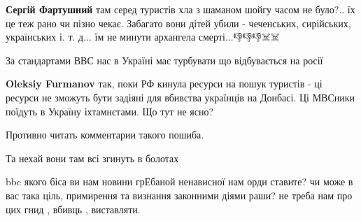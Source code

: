 \begin{itemize}
\begin{itemize}
\textbf{Сергій Фартушний} там серед туристів хла з шаманом шойгу часом не
було?.. їх це теж рано чи пізно чекає. Забагато вони дітей
убили - чеченських, сирійських, українських і. т. д... їм не минути архангела
смерті...👎👎👎☠️☠️
\end{itemize}

 
За стандартами ВВС нас в Україні має турбувати що відбувається на росії

\begin{itemize}
 
\textbf{Oleksiy Furmanov} так, поки РФ кинула ресурси на пошук туристів - ці ресурси не зможуть бути задіяні для вбивства українців на Донбасі.
Ці МВСники поїдуть в Україну іхтамнєтами.
Що тут не ясно?
\end{itemize}

 
Противно читать комментарии такого пошиба.

 
Та нехай вони там всі згинуть в болотах

 

bbc якого біса ви нам новини грЕбаной ненависної нам орди ставите? чи може в
вас така ціль, примирення та визнання законними діями раши? не треба нам про
цих гнид , вбивць , виставляти.


\end{itemize}
